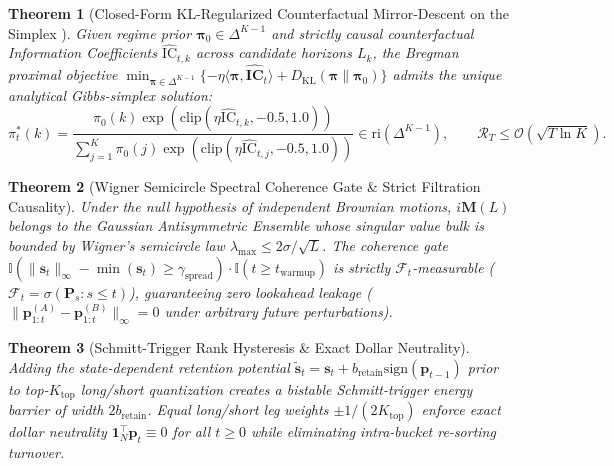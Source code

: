 \documentclass[10pt,a4paper]{article}
\newtheorem{theorem}{Theorem}[section]
\begin{document}
\begin{theorem}[Closed-Form KL-Regularized Counterfactual Mirror-Descent on the Simplex \cite{nemirovski1983}]
Given regime prior $\boldsymbol{\pi}_0 \in \Delta^{K-1}$ and strictly causal counterfactual Information Coefficients $\widehat{\mathrm{IC}}_{t,k}$ across candidate horizons $L_k$, the Bregman proximal objective $\min_{\boldsymbol{\pi} \in \Delta^{K-1}} \{ -\eta \langle \boldsymbol{\pi}, \widehat{\mathbf{IC}}_t \rangle + D_{\mathrm{KL}}(\boldsymbol{\pi} \| \boldsymbol{\pi}_0) \}$ admits the unique analytical Gibbs-simplex solution:
\begin{equation}
  \pi_t^*(k) = \frac{\pi_0(k) \exp\left(\mathrm{clip}(\eta \widehat{\mathrm{IC}}_{t,k}, -0.5, 1.0)\right)}{\sum_{j=1}^K \pi_0(j) \exp\left(\mathrm{clip}(\eta \widehat{\mathrm{IC}}_{t,j}, -0.5, 1.0)\right)} \in \mathrm{ri}(\Delta^{K-1}), \qquad \mathcal{R}_T \le \mathcal{O}(\sqrt{T \ln K}).
\end{equation}
\end{theorem}

\begin{theorem}[Wigner Semicircle Spectral Coherence Gate \& Strict Filtration Causality]
Under the null hypothesis of independent Brownian motions, $i\mathbf{M}(L)$ belongs to the Gaussian Antisymmetric Ensemble whose singular value bulk is bounded by Wigner's semicircle law $\lambda_{\max} \le 2\sigma/\sqrt{L}$. The coherence gate $\mathbb{I}(\|\mathbf{s}_t\|_\infty - \min(\mathbf{s}_t) \ge \gamma_{\mathrm{spread}}) \cdot \mathbb{I}(t \ge t_{\mathrm{warmup}})$ is strictly $\mathcal{F}_t$-measurable ($\mathcal{F}_t = \sigma(\mathbf{P}_s : s \le t)$), guaranteeing zero lookahead leakage ($\|\mathbf{p}_{1:t}^{(A)} - \mathbf{p}_{1:t}^{(B)}\|_\infty = 0$ under arbitrary future perturbations).
\end{theorem}

\begin{theorem}[Schmitt-Trigger Rank Hysteresis \& Exact Dollar Neutrality]
Adding the state-dependent retention potential $\tilde{\mathbf{s}}_t = \mathbf{s}_t + b_{\mathrm{retain}} \mathrm{sign}(\mathbf{p}_{t-1})$ prior to top-$K_{\mathrm{top}}$ long/short quantization creates a bistable Schmitt-trigger energy barrier of width $2b_{\mathrm{retain}}$. Equal long/short leg weights $\pm 1/(2K_{\mathrm{top}})$ enforce exact dollar neutrality $\mathbf{1}_N^\top \mathbf{p}_t \equiv 0$ for all $t \ge 0$ while eliminating intra-bucket re-sorting turnover.
\end{theorem}
\end{document}
